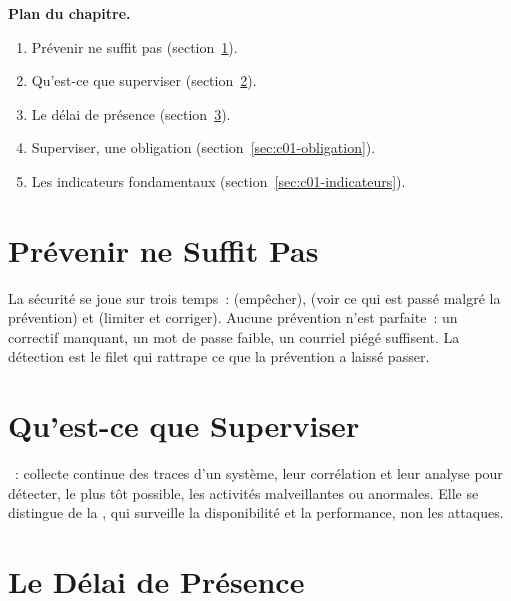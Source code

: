 \medskip
\textbf{Plan du chapitre.}
\begin{enumerate}
    \item Prévenir ne suffit pas (section~\ref{sec:c01-prevenir}).
    \item Qu'est-ce que superviser (section~\ref{sec:c01-definir}).
    \item Le délai de présence (section~\ref{sec:c01-delai}).
    \item Superviser, une obligation (section~\ref{sec:c01-obligation}).
    \item Les indicateurs fondamentaux (section~\ref{sec:c01-indicateurs}).
\end{enumerate}

\separateur

\section{Prévenir ne Suffit Pas}
\label{sec:c01-prevenir}

La sécurité se joue sur trois temps~:  (empêcher),
 (voir ce qui est passé malgré la prévention) et
 (limiter et corriger). Aucune prévention n'est parfaite~:
un correctif manquant, un mot de passe faible, un courriel piégé suffisent.
La détection est le filet qui rattrape ce que la prévention a laissé passer.

\section{Qu'est-ce que Superviser}
\label{sec:c01-definir}

\begin{boxdef}
~: collecte continue des traces d'un
système, leur corrélation et leur analyse pour détecter, le plus tôt
possible, les activités malveillantes ou anormales. Elle se distingue de la
, qui surveille la disponibilité et la
performance, non les attaques.
\end{boxdef}

\section{Le Délai de Présence}
\label{sec:c01-delai}

